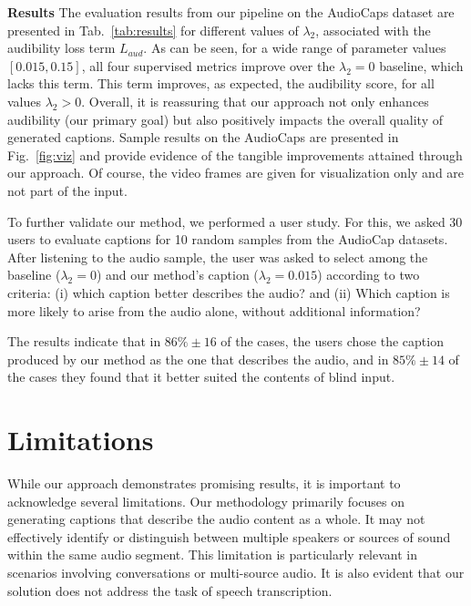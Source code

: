 \documentclass{article}
\begin{document}
\noindent\textbf{Results\quad}
The evaluation results from our pipeline on the AudioCaps dataset are presented in Tab.~\ref{tab:results} for different values of $\lambda_2$, associated with the audibility loss term $L_{aud}$. As can be seen, for a wide range of parameter values $[0.015, 0.15]$, all four supervised metrics improve over the $\lambda_2=0$ baseline, which lacks this term. This term improves, as expected, the audibility score, for all values $\lambda_2>0$. Overall, it is reassuring that our approach not only enhances audibility (our primary goal) but also positively impacts the overall quality of generated captions.
Sample results on the AudioCaps are presented in Fig.~\ref{fig:viz} and provide evidence of the tangible improvements attained through our approach. Of course, the video frames are given for visualization only and are not part of the input.

To further validate our method, we performed a user study. For this, we asked 30 users to evaluate captions for 10 random samples from the AudioCap datasets. After listening to the audio sample, the user was asked to select among the baseline ($\lambda_2=0$) and our method's caption ($\lambda_2=0.015$) according to two criteria: (i) which caption better describes the audio? and (ii) Which caption is more likely to arise from the audio alone, without additional information? 

The results indicate that in $86\% \pm 16$ of the cases, the users chose the caption produced by our method as the one that describes the audio, and in $85\% \pm 14$ of the cases they found that it better suited the contents of blind input.















\section{Limitations}
While our approach demonstrates promising results, it is important to acknowledge several limitations. Our methodology primarily focuses on generating captions that describe the audio content as a whole. It may not effectively identify or distinguish between multiple speakers or sources of sound within the same audio segment. This limitation is particularly relevant in scenarios involving conversations or multi-source audio. It is also evident that our solution does not address the task of speech transcription.
\end{document}
